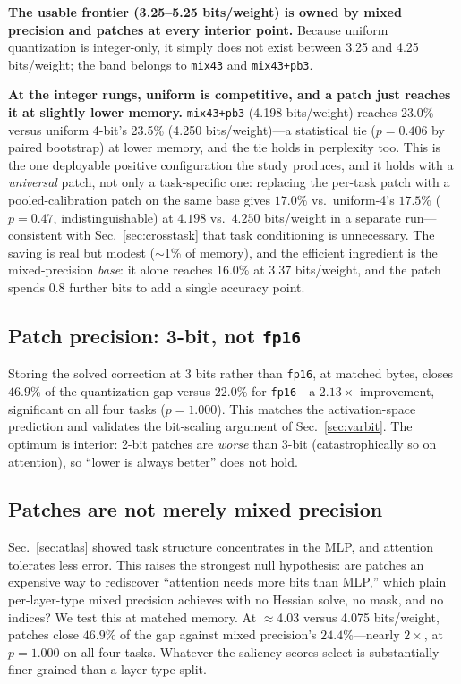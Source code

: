 \documentclass[11pt]{article}
\newcommand{\bpw}{bits/weight}
\newcommand{\code}[1]{\texttt{#1}}
\begin{document}
\textbf{The usable frontier (3.25--5.25 \bpw{}) is owned by mixed precision and
patches at every interior point.} Because uniform quantization is integer-only,
it simply does not exist between 3.25 and 4.25 \bpw{}; the band belongs to
\code{mix43} and \code{mix43+pb3}.

\textbf{At the integer rungs, uniform is competitive, and a patch just reaches
it at slightly lower memory.} \code{mix43+pb3} (4.198 \bpw{}) reaches 23.0\%
versus uniform 4-bit's 23.5\% (4.250 \bpw{})---a statistical tie ($p{=}0.406$
by paired bootstrap) at lower memory, and the tie holds in perplexity too. This
is the one deployable positive configuration the study produces, and it holds
with a \emph{universal} patch, not only a task-specific one: replacing the
per-task patch with a pooled-calibration patch on the same base gives $17.0\%$
vs.\ uniform-4's $17.5\%$ ($p{=}0.47$, indistinguishable) at $4.198$ vs.\ $4.250$
\bpw{} in a separate run---consistent with Sec.~\ref{sec:crosstask} that task
conditioning is unnecessary. The saving is real but modest ($\sim$1\% of
memory), and the efficient ingredient is the mixed-precision \emph{base}: it
alone reaches $16.0\%$ at $3.37$ \bpw{}, and the patch spends $0.8$ further
bits to add a single accuracy point.

\subsection{Patch precision: 3-bit, not \code{fp16}}
\label{sec:precision}
Storing the solved correction at 3 bits rather than \code{fp16}, at matched
bytes, closes $46.9\%$ of the quantization gap versus $22.0\%$ for
\code{fp16}---a $2.13\times$ improvement, significant on all four tasks
($p{=}1.000$). This matches the activation-space prediction and validates the
bit-scaling argument of Sec.~\ref{sec:varbit}. The optimum is interior:
2-bit patches are \emph{worse} than 3-bit (catastrophically so on attention),
so ``lower is always better'' does not hold.

\subsection{Patches are not merely mixed precision}
\label{sec:vsmixed}
Sec.~\ref{sec:atlas} showed task structure concentrates in the MLP, and
attention tolerates less error. This raises the strongest null hypothesis: are
patches an expensive way to rediscover ``attention needs more bits than MLP,''
which plain per-layer-type mixed precision achieves with no Hessian solve, no
mask, and no indices? We test this at matched memory. At $\approx$4.03 versus
4.075 \bpw{}, patches close $46.9\%$ of the gap against mixed precision's
$24.4\%$---nearly $2\times$, at $p{=}1.000$ on all four tasks. Whatever the
saliency scores select is substantially finer-grained than a layer-type split.
\end{document}
